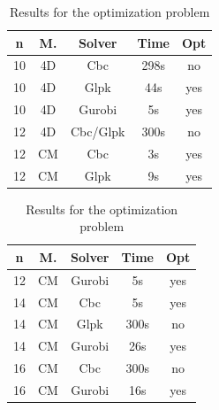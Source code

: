 \begin{table}[H]
    \centering
    \begin{tabular}{|c|c|c|c|c|}
    \hline
        \textbf{n} &  \textbf{M.} & \textbf{Solver} & \textbf{Time} & \textbf{Opt} \\
    \hline
         10 & 4D & Cbc & 298s & no \\
         10 & 4D & Glpk & 44s & yes \\
         10 & 4D & Gurobi & 5s & yes \\
         12 & 4D & Cbc/Glpk & 300s & no \\
         12 & CM & Cbc & 3s & yes \\
         12 & CM & Glpk & 9s & yes \\
    \hline
    \end{tabular}
    \begin{tabular}{|c|c|c|c|c|}
    \hline
        \textbf{n} &  \textbf{M.} & \textbf{Solver} & \textbf{Time} & \textbf{Opt} \\
    \hline
         12 & CM & Gurobi & 5s & yes \\
         14 & CM & Cbc & 5s & yes \\
         14 & CM & Glpk & 300s & no \\
         14 & CM & Gurobi & 26s & yes \\
         16 & CM & Cbc & 300s & no \\
         16 & CM & Gurobi & 16s & yes \\
    \hline
    \end{tabular}
    \caption{Results for the optimization problem}
    \label{tab:mip2}
\end{table}